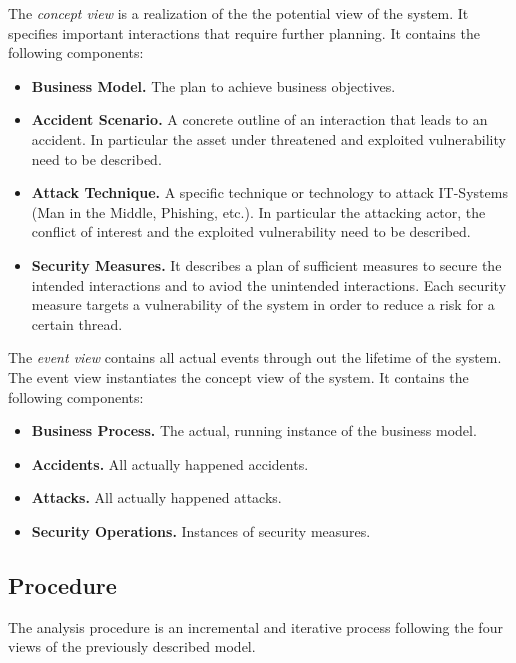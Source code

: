 The \emph{concept view} is a realization of the the potential view of the system.
It specifies important interactions that require further planning.
It contains the following components:
\begin{itemize}
\item \textbf{Business Model.}
The plan to achieve business objectives.

\item \textbf{Accident Scenario.}
A concrete outline of an interaction that leads to an accident.
In particular the asset under threatened and exploited vulnerability need to be described.

\item \textbf{Attack Technique.}
A specific technique or technology to attack IT-Systems (Man in the Middle, Phishing, etc.).
In particular the attacking actor, the conflict of interest and the exploited vulnerability need to be described.

\item \textbf{Security Measures.}
It describes a plan of sufficient measures to secure the intended interactions and to aviod the unintended interactions.
Each security measure targets a vulnerability of the system in order to reduce a risk for a certain thread.
\end{itemize}




The \emph{event view} contains all actual events through out the lifetime of the system.
The event view instantiates the concept view of the system.
It contains the following components:
\begin{itemize}
\item \textbf{Business Process.}
The actual, running instance of the business model.

\item \textbf{Accidents.}
All actually happened accidents.

\item \textbf{Attacks.}
All actually happened attacks.

\item \textbf{Security Operations.}
Instances of security measures.
\end{itemize}


\subsection{Procedure}

The analysis procedure is an incremental and iterative process following the four views of the previously described model.

